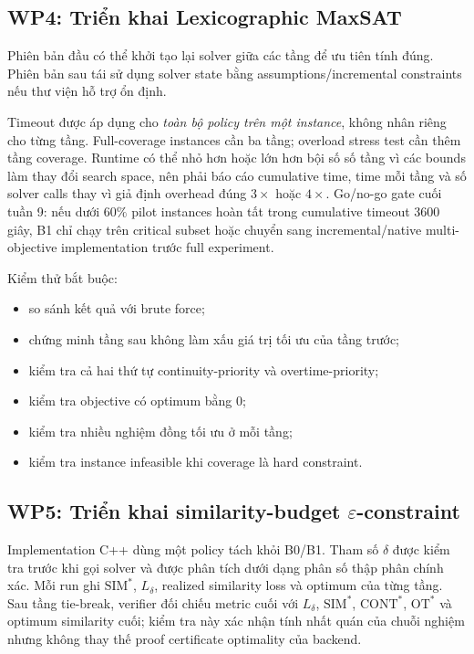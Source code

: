 \documentclass[12pt,a4paper]{article}
\newcommand{\SIM}{\mathrm{SIM}}
\newcommand{\CONT}{\mathrm{CONT}}
\newcommand{\OT}{\mathrm{OT}}
\begin{document}
\subsection{WP4: Triển khai Lexicographic MaxSAT}

Phiên bản đầu có thể khởi tạo lại solver giữa các tầng để ưu tiên tính đúng.
Phiên bản sau tái sử dụng solver state bằng assumptions/incremental constraints
nếu thư viện hỗ trợ ổn định.

Timeout được áp dụng cho \emph{toàn bộ policy trên một instance}, không nhân
riêng cho từng tầng. Full-coverage instances cần ba tầng; overload stress test
cần thêm tầng coverage. Runtime có thể nhỏ hơn hoặc lớn hơn bội số số tầng vì
các bounds làm thay đổi search space, nên phải báo cáo cumulative time, time mỗi
tầng và số solver calls thay vì giả định overhead đúng $3\times$ hoặc $4\times$.
Go/no-go gate cuối tuần 9: nếu dưới $60\%$ pilot instances hoàn tất trong
cumulative timeout 3600 giây, B1 chỉ chạy trên critical subset hoặc chuyển sang
incremental/native multi-objective implementation trước full experiment.

Kiểm thử bắt buộc:
\begin{itemize}
  \item so sánh kết quả với brute force;
  \item chứng minh tầng sau không làm xấu giá trị tối ưu của tầng trước;
  \item kiểm tra cả hai thứ tự continuity-priority và overtime-priority;
  \item kiểm tra objective có optimum bằng 0;
  \item kiểm tra nhiều nghiệm đồng tối ưu ở mỗi tầng;
  \item kiểm tra instance infeasible khi coverage là hard constraint.
\end{itemize}

\subsection{WP5: Triển khai similarity-budget
\texorpdfstring{$\varepsilon$}{epsilon}-constraint}

Implementation C++ dùng một policy tách khỏi B0/B1. Tham số $\delta$ được kiểm
tra trước khi gọi solver và được phân tích dưới dạng phân số thập phân chính
xác. Mỗi run ghi $\SIM^*$, $L_\delta$, realized similarity loss và optimum của
từng tầng. Sau tầng tie-break, verifier đối chiếu metric cuối với
$L_\delta$, $\SIM^*$, $\CONT^*$, $\OT^*$ và optimum similarity cuối; kiểm tra
này xác nhận tính nhất quán của chuỗi nghiệm nhưng không thay thế proof
certificate optimality của backend.
\end{document}
